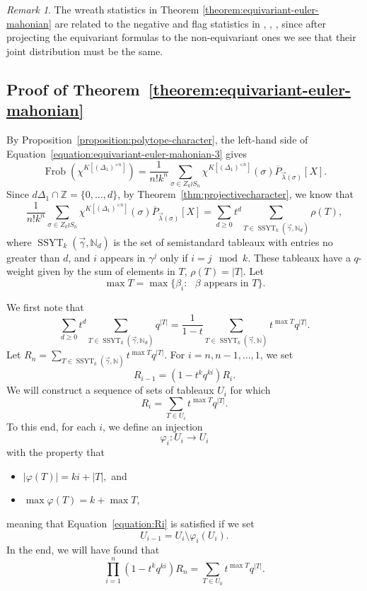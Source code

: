 \documentclass[a4paper,12pt]{amsart}
\theoremstyle{plain}
\theoremstyle{definition}
\theoremstyle{remark}
\newtheorem{remark}[theorem]{Remark}
\DeclareMathOperator{\Frob}{Frob}
\DeclareMathOperator{\SSYT}{SSYT}
\begin{document}
\begin{remark}
    The wreath statistics in Theorem \ref{theorem:equivariant-euler-mahonian} are related to the negative and flag statistics in \cite{bagno-euler}, \cite{bagno-biagioli-colored}, \cite{braun-olsen-statistics}, since after projecting the equivariant formulas to the non-equivariant ones we see that their joint distribution must be the same.
\end{remark}

\subsection{Proof of Theorem~\ref{theorem:equivariant-euler-mahonian}}\label{subsection:proof-of-theorem-5-X}

By Proposition~\ref{proposition:polytope-character}, the left-hand side of Equation~\ref{equation:equivariant-euler-mahonian-3} gives
    \[
    \Frob(\chi^{K[(\Delta_1)^{\times n}]}) = 
    \frac{1}{n! k^n}
    \sum_{\sigma \in Z_k \wr S_n} \chi^{K[(\Delta_1)^{\times n}]}(\sigma)
\overline{P}_{\vec{\lambda}(\sigma)}[X].
    \]
Since $d \Delta_1 \cap \mathbb{Z} =\{0,\dots,d\}$, by Theorem~\ref{thm:projectivecharacter}, we know that
\[
    \frac{1}{n! k^n}
    \sum_{\sigma \in Z_k \wr S_n} \chi^{K[(\Delta_1)^{\times n}]}(\sigma)
\overline{P}_{\vec{\lambda}(\sigma)}[X]
=
\sum_{d \geq 0} t^d \sum_{T \in \SSYT_k(\vec{\gamma},\mathbb{N}_d)} \rho(T),
    \]
where $\SSYT_k(\vec{\gamma},\mathbb{N}_d)$ is the set of semistandard tableaux with entries no greater than $d$, and $i$ appears in $\gamma^j$ only if $i = j \mod k$. These tableaux have a $q$-weight given by the sum of elements in $T$,
$
\rho(T) = |T|.
$
Let
\[
\max T = \max\{ \beta_i: \text{ $\beta$ appears in $T$} \}.
\]

We first note that 
\[
\sum_{d \geq 0} t^d \sum_{T \in \SSYT_k(\vec{\gamma},\mathbb{N}_d)} 
q^{|T|} = \frac{1}{1-t} \sum_{T \in \SSYT_k(\vec{\gamma},\mathbb{N})} t^{\max T} q^{|T|}.
\]
Let 
$R_{n} = \sum_{T \in \SSYT_k(\vec{\gamma},\mathbb{N})} t^{\max T} q^{|T|}.$
For $i = n,n-1,\dots, 1$, we set
\begin{equation} \label{equation:Ri}
 R_{i-1} = (1-t^kq^{ki}) R_{i} .
\end{equation}
We will construct a sequence of sets of tableaux $U_i$ for which 
\[
R_i = \sum_{T \in U_i} t^{\max T} q^{|T|}.
\]
To this end, for each $i$, we define an injection
\[
\varphi_i: U_i \rightarrow U_i
\]
with the property that 
\begin{itemize}
    \item $|\varphi(T)| = ki+|T|,$ and 
    \item $\max \varphi(T) = k + \max T$,
\end{itemize}
meaning that Equation~\ref{equation:Ri} is satisfied if we set
\[
U_{i-1} = U_i \setminus  \varphi_i(U_i).
\]
In the end, we will have found that
\[
\prod_{i=1}^n (1-t^kq^{ki}) R_n = \sum_{T \in U_0} t^{\max T} q^{|T|}.
\]
\end{document}
